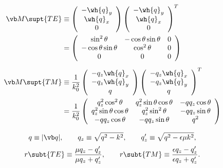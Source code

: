 \documentclass[letterpaper]{article}
\begin{document}
\begin{align*}
 \vb M\supt{TE}
&\equiv
 \left(\begin{array}{c}
 -\wh{q}_y \\ \wh{q}_x \\ 0 
 \end{array}\right)
 \left(\begin{array}{c}
 -\wh{q}_y \\ \wh{q}_x \\ 0 
 \end{array}\right)^T
\\
&=\left(\begin{array}{ccc}
  \sin^2 \theta & -\cos\theta \sin\theta & 0 \\
  -\cos\theta \sin\theta & \cos^2 \theta & 0 \\
  0 & 0 & 0 
  \end{array}\right)
\\[5pt]
 \vb M\supt{TM}
&\equiv
 \frac{1}{k_0^2}
 \left(\begin{array}{c}
  -q_z \wh{q}_x \\
  -q_z \wh{q}_y \\
   q   
 \end{array}\right)
 \left(\begin{array}{c}
  -q_z \wh{q}_x \\
  -q_z \wh{q}_y \\
   q   
 \end{array}\right)^T
\\
&= \frac{1}{k_0^2}
  \left(\begin{array}{ccc}
  q_z^2 \cos^2 \theta          & q_z^2 \sin\theta \cos\theta & -q q_z \cos\theta \\
  q_z^2 \sin \theta \cos\theta & q_z^2 \sin^2\theta          & -q q_z \sin\theta \\
  -q q_z \cos\theta            & -q q_z \sin\theta           & q^2
  \end{array}\right)
\end{align*}

$$ q \equiv |\vb q|,
   \qquad 
   q_z        \equiv \sqrt{ q^2 - k^2 },
   \qquad
   q_z^\prime \equiv \sqrt{ q^2 - \epsilon \mu k^2},
$$
$$
   r\subt{TE} \equiv \frac{\mu q_z - q_z^\prime}{\mu q_z + q_z^\prime},
   \qquad
   r\subt{TM} \equiv \frac{\epsilon q_z - q_z^\prime}{\epsilon q_z + q_z^\prime}.
$$
\end{document}
